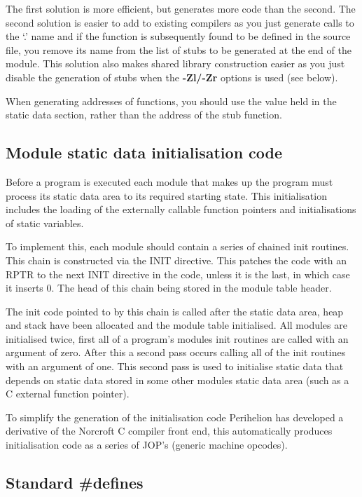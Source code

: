 The first solution is more efficient, but generates more code than the
second. The second solution is easier to add to existing compilers as
you just generate calls to the `.' name and if the function is
subsequently found to be
defined in the source file, you remove its name from the list of stubs
to be generated at the end of the module. This solution also
makes shared library construction easier as you just disable the generation
of stubs when the {\bf -Zl/-Zr}  options is used (see below).

When generating addresses of functions, you should use the value held in the
static data section, rather than the address of the stub function.

\subsection{Module static data initialisation code}

Before a program is executed each module that makes up the program must
process its static data area to its required starting state.
This initialisation includes the loading of the externally callable function
pointers and initialisations of static variables.

To implement this, each module should contain a series of chained init routines.
This chain is constructed via the INIT directive. This patches the
code with an RPTR to the next INIT directive in the code, unless it is
the last, in which case it inserts 0. The head of this chain being stored in
the module table header.

The init code pointed to by this chain is called
after the static data area, heap and stack have been allocated and the module
table initialised. All modules are initialised twice, first all of a
program's modules init routines are called with an argument of zero.
After this a second pass
occurs calling all of the init routines with an argument of one.
This second pass is used to initialise static data that depends on static data
stored in some other modules static data area
(such as a C external function pointer).

To simplify the generation of the initialisation code Perihelion has
developed a derivative of the Norcroft C compiler front end, this automatically
produces initialisation code as a series of JOP's (generic machine opcodes).

\subsection{Standard \#defines}


